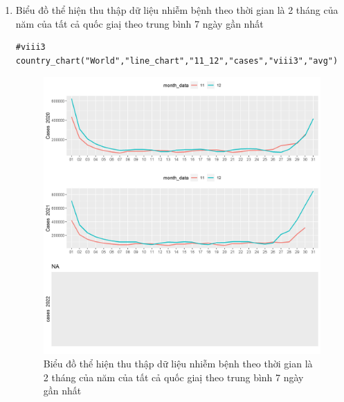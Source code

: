 \documentclass[a4paper]{article}
\theoremstyle{definition}
\begin{document}
\begin{enumerate}[i)]
\begin{enumerate}[1)]
    \item Biểu đồ thể hiện thu thập dữ liệu nhiễm bệnh theo thời gian là 2 tháng của năm của tất cả quốc giaị theo trung bình 7 ngày gần nhất
    \begin{lstlisting}
#viii3
country_chart("World","line_chart","11_12","cases","viii3","avg")
    \end{lstlisting}
    \begin{figure}[htp]
        \centering
		\includegraphics[scale = 0.7]{Images/VIII/viii3 World .jpeg} 
		\caption{Biểu đồ thể hiện thu thập dữ liệu nhiễm bệnh theo thời gian là 2 tháng của năm của tất cả quốc giaị theo trung bình 7 ngày gần nhất}
		\label{fig:my_label}
	\end{figure}
	\newpage
	

\end{enumerate}
\end{enumerate}
\end{document}
